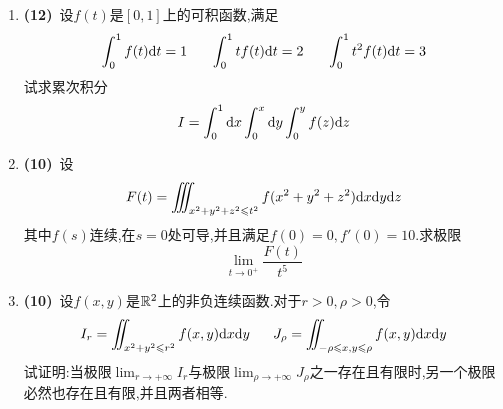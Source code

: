 \documentclass{ctexart}
\begin{document}
\begin{enumerate}[leftmargin=*,label=\textbf{\arabic*.}]
    \item \textbf{(12)}\ 设$f(t)$是$[0,1]$上的可积函数,满足
        \[\int_0^1f(t)\di t=1\ \ \ \ \ \int_0^1tf(t)\di t=2\ \ \ \ \ \int_0^1t^2f(t)\di t=3\]
        试求累次积分
        \[I=\int_0^1\mathrm{d} x\int_0^x\mathrm{d} y\int_0^yf(z)\mathrm{d} z\]

    \item \textbf{(10)}\ 设
        \[F(t)=\iiint_{x^2+y^2+z^2\leqslant t^2}f(x^2+y^2+z^2)\mathrm{d} x\mathrm{d} y\mathrm{d} z\]
        其中$f(s)$连续,在$s=0$处可导,并且满足$f(0)=0,f'(0)=10$.求极限
        \[\lim_{t\to0^+}\dfrac{F(t)}{t^5}\]
    
    \item \textbf{(10)}\ 设$f(x,y)$是$\mathbb{R}^2$上的非负连续函数.对于$r>0,\rho>0$,令
        \[I_r=\iint_{x^2+y^2\leqslant r^2}f(x,y)\mathrm{d} x\mathrm{d} y\ \ \ \ \ J_{\rho}=\iint_{-\rho\leqslant x,y\leqslant\rho}f(x,y)\mathrm{d} x\mathrm{d} y\]
        试证明:当极限$\lim_{r\to+\infty}I_r$与极限$\lim_{\rho\to+\infty}J_\rho$之一存在且有限时,另一个极限必然也存在且有限,并且两者相等.
\end{enumerate}
\end{document}
